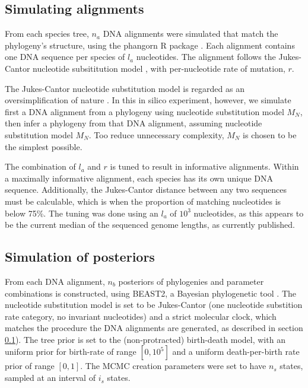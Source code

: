 \subsection{Simulating alignments}
\label{subsec:simulating_alignments}

From each species tree, $n_a$ DNA alignments were simulated that match the
phylogeny's structure, using the phangorn R package \cite{phangorn}. 
Each alignment contains one DNA sequence per species 
of $l_a$ nucleotides. The alignment follows the Jukes-Cantor nucleotide 
subsititution model \cite{cantor1969mammalian}, 
with per-nucleotide rate of mutation, $r$.

The Jukes-Cantor
nucleotide substitution model is regarded as an oversimplification of 
nature \cite{unknown}. In this in silico experiment, however, we simulate first
a DNA alignment from a phylogeny using nucleotide substitution model $M_N$, 
then infer a phylogeny from that DNA alignment, assuming nucleotide substitution model $M_N$.
Too reduce unnecessary complexity, $M_N$ is chosen to be the simplest possible.

The combination of $l_a$ and $r$ is tuned to result in informative alignments. 
Within a maximally informative alignment, each species has its own unique DNA sequence.
Additionally, the Jukes-Cantor distance \cite{unknown} between any 
two sequences must be calculable, which is when the proportion of matching nucleotides is below 75\%.
The tuning was done using an $l_a$ of $10^3$ nucleotides, 
as this appears to be the current median of the sequenced genome lengths, as currently published.

\subsection{Simulation of posteriors}

From each DNA alignment, $n_b$ posteriors of phylogenies and parameter combinations 
is constructed, using BEAST2, a Bayesian phylogenetic tool \cite{bouckaert2014beast}.
The nucleotide substitution model is set to 
be Jukes-Cantor (one nucleotide substition rate category, no invariant nucleotides) 
and a strict molecular clock, which matches the procedure the DNA alignments are generated, 
as described in section \ref{subsec:simulating_alignments}).
The tree prior is set to the (non-protracted) birth-death model, 
with an uniform prior for birth-rate of range $[0, 10^5]$ and 
a uniform death-per-birth rate prior of range $[0, 1]$. 
The MCMC creation parameters were set to have $n_s$ states, sampled at an interval of $i_s$ states.

